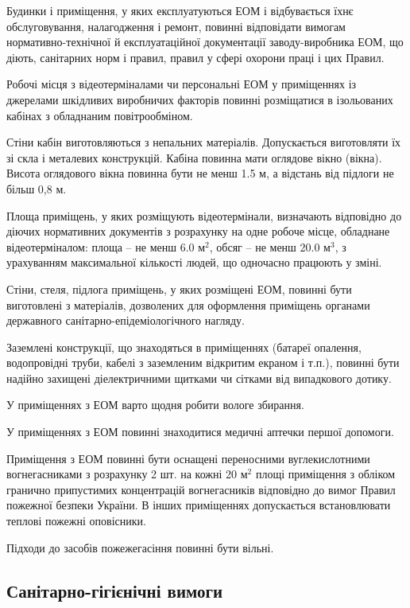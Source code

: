 \documentclass[simple,a4paper,14pt,ukrainian,utf8]{eskdtext}
\begin{document}
\begin{appendices}
                Будинки і приміщення, у яких експлуатуються ЕОМ і відбувається їхнє обслуговування, налагодження і ремонт, повинні відповідати вимогам нормативно-технічної й експлуатаційної документації заводу-виробника ЕОМ, що діють, санітарних норм і правил, правил у сфері охорони праці і цих Правил.

                Робочі місця з відеотерміналами чи персональні ЕОМ у приміщеннях із джерелами шкідливих виробничих факторів повинні розміщатися в ізольованих кабінах з обладнаним повітрообміном.


                Стіни кабін виготовляються з непальних матеріалів. Допускається виготовляти їх зі скла і металевих конструкцій. Кабіна повинна мати оглядове вікно (вікна). Висота оглядового вікна повинна бути не менш 1.5 м, а відстань від підлоги не більш 0,8 м.

                Площа приміщень, у яких розміщують відеотермінали, визначають відповідно до діючих нормативних документів з розрахунку на одне робоче місце, обладнане відеотерміналом: площа -- не менш 6.0 м$^{2}$, обсяг -- не менш 20.0 м$^{3}$, з урахуванням максимальної кількості людей, що одночасно працюють у зміні.

                Стіни, стеля, підлога приміщень, у яких розміщені ЕОМ, повинні бути виготовлені з матеріалів, дозволених для оформлення приміщень органами державного санітарно-епідеміологічного нагляду.

                Заземлені конструкції, що знаходяться в приміщеннях (батареї опалення, водопровідні труби, кабелі з заземленим відкритим екраном і т.п.), повинні бути надійно захищені діелектричними щитками чи сітками від випадкового дотику.

                У приміщеннях з ЕОМ варто щодня робити вологе збирання.

                У приміщеннях з ЕОМ повинні знаходитися медичні аптечки першої допомоги.

                Приміщення з ЕОМ повинні бути оснащені переносними вуглекислотними вогнегасниками з розрахунку 2 шт. на кожні 20 м$^{2}$ площі приміщення з обліком гранично припустимих концентрацій вогнегасників відповідно до вимог Правил пожежної безпеки України. В інших приміщеннях допускається встановлювати теплові пожежні оповісники.

                Підходи до засобів пожежегасіння повинні бути вільні.

            \subsection{Санітарно-гігієнічні вимоги}


\end{appendices}
\end{document}
